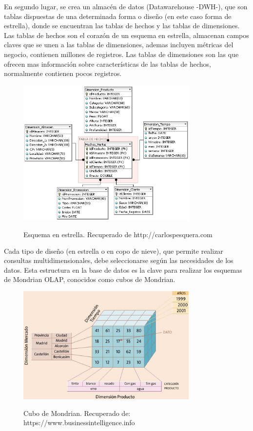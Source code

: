 En segundo lugar, se crea un almacén de datos (Datawarehouse -DWH-), que son tablas dispuestas de una determinada forma o diseño (en este caso forma de estrella), donde se encuentran las tablas de hechos y las tablas de dimensiones. Las tablas de hechos son el corazón de un esquema en estrella, almacenan campos claves que se unen a las tablas de dimensiones, ademas incluyen métricas del negocio, contienen millones de registros. Las tablas de dimensiones son las que ofrecen mas información sobre características de las tablas de hechos, normalmente contienen pocos registros.
\begin{figure}[h]
	\centering
	\caption{Esquema en estrella. Recuperado de http://carlospesquera.com}
	\includegraphics[width=0.8\textwidth]{recursos/Esquema_en_estrella}
	\label{fig:esquemaestrella}
\end{figure}
\FloatBarrier

Cada tipo de diseño (en estrella o en copo de nieve), que permite realizar consultas multidimensionales, debe seleccionarse según las necesidades de los datos. Esta estructura en la base de datos es la clave para realizar los esquemas de Mondrian OLAP, conocidos como cubos de Mondrian. \cite{MONDRIAN}

\begin{figure}[h]
	\centering
	\caption{Cubo de Mondrian. Recuperado de: https://www.businessintelligence.info}
	\includegraphics[width=0.8\textwidth]{recursos/modelo-dimensional-cubo}
	\label{fig:modelo-dimensional-cubo}
\end{figure}
\FloatBarrier

